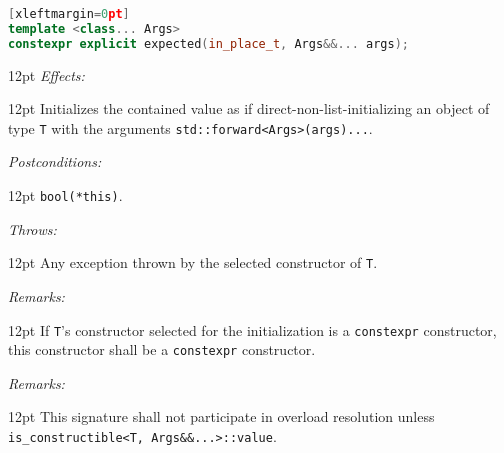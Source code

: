 \documentclass[a4paper,10pt]{article}
\newcommand{\cpp}[1]{\lstinline{#1}}
\newcommand{\wordingItem}[1]{\noindent\textit{#1:}}
\newenvironment{wordingTextItem}[1]{\wordingItem{#1}\vspace{2pt}\noindent\begin{adjustwidth}{12pt}{}}{\vspace{2pt}\end{adjustwidth}}
\newenvironment{wordingPara}{\begin{adjustwidth}{12pt}{}}{\end{adjustwidth}}
\begin{document}
\begin{lstlisting}[language=C++][xleftmargin=0pt]
template <class... Args>
constexpr explicit expected(in_place_t, Args&&... args); 
\end{lstlisting}
\begin{wordingPara}
\begin{wordingTextItem}{Effects}
Initializes the contained value as if direct-non-list-initializing an object of type \cpp{T} with the arguments \cpp{std::forward<Args>(args)...}.
\end{wordingTextItem}
\begin{wordingTextItem}{Postconditions}
\cpp{bool(*this)}.
\end{wordingTextItem}
\begin{wordingTextItem}{Throws}
Any exception thrown by the selected constructor of \cpp{T}.
\end{wordingTextItem}
\begin{wordingTextItem}{Remarks}
If \cpp{T}'s constructor selected for the initialization is a \cpp{constexpr} constructor, this constructor shall be a \cpp{constexpr} constructor.
\end{wordingTextItem}
\begin{wordingTextItem}{Remarks}
This signature shall not participate in overload resolution unless\\
\cpp{is_constructible<T, Args&&...>::value}.
\end{wordingTextItem}
\end{wordingPara}
\end{document}
